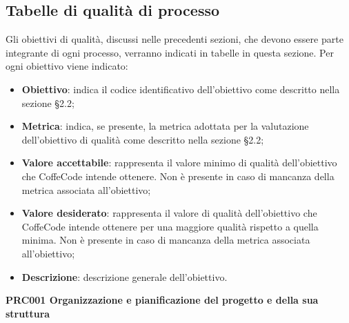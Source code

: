 \documentclass[../piano-di-qualifica.tex]{subfiles}
\begin{document}
\subsection{Tabelle di qualità di processo}
\label{sub:tabelle_di_qualita_di_processo}
Gli obiettivi di qualità, discussi nelle precedenti sezioni, che devono essere parte integrante di ogni processo, verranno indicati in tabelle in questa sezione.
Per ogni obiettivo viene indicato:

\begin{itemize}
   \item \textbf{Obiettivo}: indica il codice identificativo dell'obiettivo come descritto nella sezione §2.2;
   \item \textbf{Metrica}: indica, se presente, la metrica adottata per la valutazione dell'obiettivo di qualità come descritto nella sezione §2.2;
   \item \textbf{Valore accettabile}: rappresenta il valore minimo di qualità dell'obiettivo che CoffeCode intende ottenere. Non è presente in caso di mancanza della metrica associata all'obiettivo;
   \item \textbf{Valore desiderato}: rappresenta il valore di qualità dell'obiettivo che CoffeCode intende ottenere per una maggiore qualità rispetto a quella minima. Non è presente in caso di mancanza della metrica associata all'obiettivo;
   \item \textbf{Descrizione}: descrizione generale dell'obiettivo.
\end{itemize}

\begin{center}
    \centering
    \textbf{PRC001 Organizzazione e pianificazione del progetto e della sua struttura}
\end{center}
\end{document}
